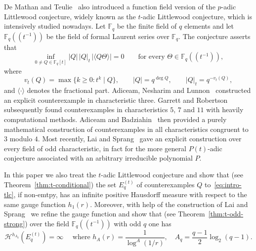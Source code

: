 \documentclass[11pt]{article}
\theoremstyle{remark}
\newcommand{\Haus}{\mathcal{H}}
\begin{document}
De Mathan and Teulie~\cite{deMathanTeulie2004} also introduced a
function field version of the $p$-adic Littlewood conjecture, widely
known as the $t$-adic Littlewood conjecture, which is intensively
studied nowadays. Let $\mathbb F_q$ be the finite field of $q$
elements and let $\mathbb F_q((t^{-1}))$ be the field of formal
Laurent series over $\mathbb F_q$. The conjecture asserts that
\begin{equation} \label{eq:intro-tlc}
 \inf_{0\ne Q\in\mathbb F_q[t]}
 |Q|\,|Q|_t\,|\langle Q\Theta\rangle|=0
 \qquad\text{for every }\Theta\in\mathbb F_q((t^{-1})),
\end{equation}
where
\[
    v_t(Q)=\max\{k\geq0:t^k\mid Q\},
    \qquad
    |Q|=q^{\deg Q},
    \qquad
    |Q|_t=q^{-v_t(Q)},
\]
and $\langle\cdot\rangle$ denotes the fractional part. Adiceam,
Nesharim and Lunnon~\cite{AdiceamNesharimLunnon2021} constructed an
explicit counterexample in characteristic three.  Garrett and
Robertson~\cite{GarrettRobertson2026} subsequently found
counterexamples in characteristics $5$, $7$ and $11$ with heavily
computational methods. Adiceam and
Badziahin~\cite{AdiceamBadziahin2025} then provided a purely
mathematical construction of counterexamples in all characteristics
congruent to $3$ modulo $4$.  Most recently, Lai and
Sprang~\cite{LaiSprang2026} gave an explicit construction over every
field of odd characteristic, in fact for the more general
$P(t)$-adic conjecture associated with an arbitrary irreducible
polynomial $P$.


In this paper we also treat the $t$-adic Littlewood conjecture and
show that (see Theorem~\ref{thm:t-conditional}) the set $E_q^{(t)}$
of counterexamples $Q$ to~\eqref{eq:intro-tlc}, if non-emtpy, has an
infinite positive Hausdorff measure with respect to the same gauge
function $h_1(r)$. Moreover, with help of the construction of Lai
and Sprang~\cite{LaiSprang2026} we refine the gauge function and
show that (see Theorem~\ref{thm:t-odd-strong}) over the field
$\mathbb F_q((t^{-1}))$ with odd $q$ one has
\begin{equation} \label{eq:intro-strong-t}
 \Haus^{h_{A_q}}(E_q^{(t)})=\infty
 \quad\text{ where } h_A(r) = \frac{1}{\log^A(1/r)},\quad
 A_q=\frac{q-1}{2}\log_2(q-1).
\end{equation}
\end{document}
